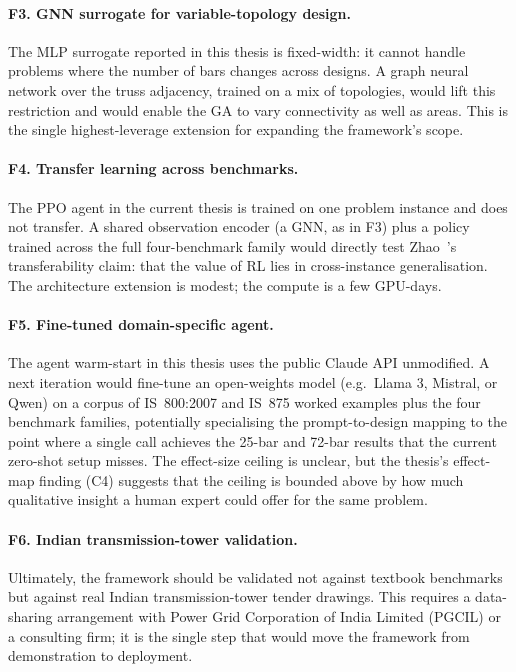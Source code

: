 \paragraph{F3. GNN surrogate for variable-topology design.} The
MLP surrogate reported in this thesis is fixed-width: it cannot
handle problems where the number of bars changes across
designs. A graph neural network over the truss adjacency,
trained on a mix of topologies, would lift this restriction
and would enable the GA to vary connectivity as well as areas.
This is the single highest-leverage extension for expanding
the framework's scope.

\paragraph{F4. Transfer learning across benchmarks.} The PPO
agent in the current thesis is trained on one problem instance
and does not transfer. A shared observation encoder (a GNN, as
in F3) plus a policy trained across the full four-benchmark
family would directly test Zhao~\cite{zhao2021rl}'s
transferability claim: that the value of RL lies in
cross-instance generalisation. The architecture extension is
modest; the compute is a few GPU-days.

\paragraph{F5. Fine-tuned domain-specific agent.} The agent
warm-start in this thesis uses the public Claude API
unmodified. A next iteration would fine-tune an open-weights
model (e.g.\ Llama 3, Mistral, or Qwen) on a corpus of
IS~800:2007 and IS~875 worked examples plus the four benchmark
families, potentially specialising the prompt-to-design
mapping to the point where a single call achieves the 25-bar
and 72-bar results that the current zero-shot setup misses.
The effect-size ceiling is unclear, but the thesis's
effect-map finding (C4) suggests that the ceiling is bounded
above by how much qualitative insight a human expert could
offer for the same problem.

\paragraph{F6. Indian transmission-tower validation.}
Ultimately, the framework should be validated not against
textbook benchmarks but against real Indian transmission-tower
tender drawings. This requires a data-sharing arrangement with
Power Grid Corporation of India Limited (PGCIL) or a
consulting firm; it is the single step that would move the
framework from demonstration to deployment.


